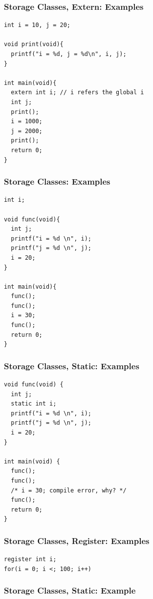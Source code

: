 \documentclass{../c-lecture}
\begin{document}
\begin{frame}[fragile]
  \frametitle{Storage Classes, Extern: Examples}
  \scriptsize
  \begin{verbatim}
int i = 10, j = 20;

void print(void){
  printf("i = %d, j = %d\n", i, j);
}

int main(void){
  extern int i; // i refers the global i
  int j;
  print();
  i = 1000;
  j = 2000;
  print();
  return 0;
}
  \end{verbatim}
\end{frame}

\begin{frame}[fragile]
  \frametitle{Storage Classes: Examples}
  \scriptsize
  \begin{verbatim}
int i;

void func(void){
  int j;
  printf("i = %d \n", i);
  printf("j = %d \n", j);
  i = 20;
}

int main(void){
  func();
  func();
  i = 30;
  func();
  return 0;
}
  \end{verbatim}
\end{frame}

\begin{frame}[fragile]
  \frametitle{Storage Classes, Static: Examples}
  \scriptsize
  \begin{verbatim}
void func(void) {
  int j;
  static int i;
  printf("i = %d \n", i);
  printf("j = %d \n", j);
  i = 20;
}

int main(void) {
  func();
  func();
  /* i = 30; compile error, why? */
  func();
  return 0;
}
  \end{verbatim}
\end{frame}

\begin{frame}[fragile]
  \frametitle{Storage Classes, Register: Examples}
  \scriptsize
  \begin{verbatim}
register int i;
for(i = 0; i <; 100; i++)
  \end{verbatim}
\end{frame}

\begin{frame}[fragile]
  \frametitle{Storage Classes, Static: Example}
  \scriptsize
  \inputminted[bgcolor=Black]{c}{./src/static.c}
\end{frame}
\end{document}
